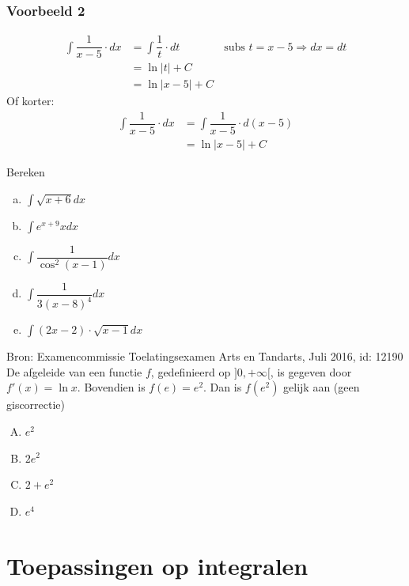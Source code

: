 \documentclass[a4paper,12pt, twoside]{article}
\begin{document}
\subsubsection*{Voorbeeld 2}
\begin{align*}
  \int \dfrac{1}{x-5} \cdot dx &= \int \dfrac{1}{t} \cdot dt \qquad\qquad\mbox{subs }t=x-5 \Rightarrow dx = dt\\
  &= \ln|t| + C\\
  &= \ln|x-5| + C
\end{align*}
Of korter:
\begin{align*}
  \int \dfrac{1}{x-5} \cdot dx &= \int \dfrac{1}{x-5} \cdot d(x-5)\\
  &= \ln|x-5| + C
\end{align*}

\begin{oefening}
  Bereken
  \begin{multicols}{2}
  \begin{enumerate}[(a)]
  \item $\displaystyle\int \sqrt{x+6} dx$
  \item $\displaystyle\int e^{x+9}x dx$
  \item $\displaystyle\int \dfrac{1}{\cos^2(x-1)} dx$
  \item $\displaystyle\int \dfrac{1}{3(x-8)^4} dx$
  \item $\displaystyle\int (2x-2)\cdot\sqrt{x-1} dx$
  \end{enumerate}
\end{multicols}
\end{oefening}











\pagebreak
\begin{oefening}{\scriptsize Bron: Examencommissie Toelatingsexamen Arts en Tandarts, Juli 2016, id: 12190}\\
De afgeleide van een functie $f$, gedefinieerd op $]0,+\infty[$, is gegeven door $f'(x)=\ln x$. Bovendien is $f(e)=e^2$. Dan is $f(e^2)$ gelijk aan \hfill(geen giscorrectie)
\begin{enumerate}[(A)]
  \itemsep.5em
  \item $e^2$
  \item $2e^2$
  \item $2+e^2$
  \item $e^4$
\end{enumerate}
\end{oefening}

\cleardoublepage
\section{Toepassingen op integralen}
\end{document}
